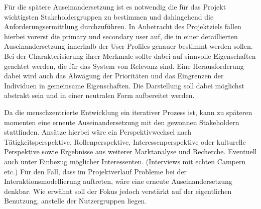 Für die spätere Auseinandersetzung ist es notwendig die für das Projekt wichtigsten Stakeholdergruppen zu bestimmen und dahingehend die Anforderungsermittlung durchzuführen.
In Anbetracht des Projektziels fallen hierbei vorerst die primary und secondary user auf, die in einer detaillierten Auseinandersetzung innerhalb der User Profiles genauer bestimmt werden sollen.
Bei der Charakterisierung ihrer Merkmale sollte dabei auf sinnvolle Eigenschaften geachtet werden, die für das System von Relevanz sind. Eine Herausforderung dabei wird auch das Abwägung der Prioritäten und das Eingrenzen der Individuen in gemeinsame Eigenschaften. Die Darstellung soll dabei möglichst abstrakt sein und in einer neutralen Form aufbereitet werden.
 
Da die menschzentrierte Entwicklung ein iterativer Prozess ist, kann zu späteren momenten eine erneute Auseinandersetzung mit den gewonnen Stakeholdern stattfinden.
Ansätze hierbei wäre ein Perspektivwechsel nach Tätigkeitsperspektive, Rollenperspektive, Interessenperspektive oder kulturelle Perspektive sowie Ergebnisse aus weiterer Marktanalyse und Recherche. Eventuell auch unter Einbezug möglicher Interessenten. (Interviews mit echten Campern etc.) Für den Fall, dass im Projektverlauf Probleme bei der Interaktionsmodellierung auftreten, wäre eine erneute Auseinandersetzung denkbar. Wie erwähnt soll der Fokus  jedoch verstärkt auf der eigentlichen Benutzung, anstelle der Nutzergruppen liegen.\\
 


 


